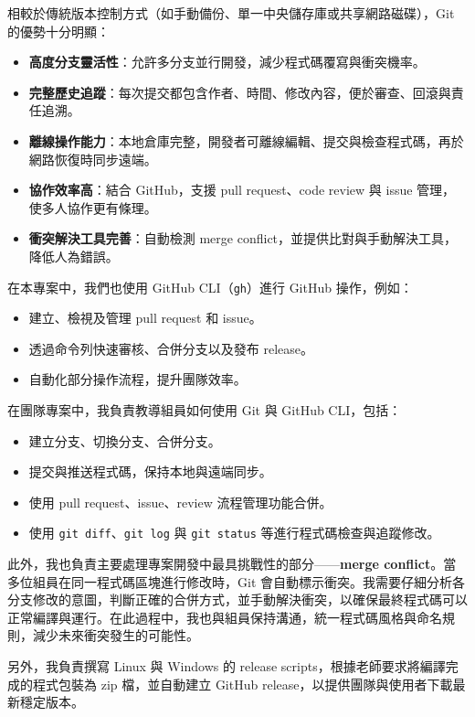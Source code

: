 \documentclass[a4paper,12pt]{article}
\begin{document}
相較於傳統版本控制方式（如手動備份、單一中央儲存庫或共享網路磁碟），Git 的優勢十分明顯：
\begin{itemize}
  \item \textbf{高度分支靈活性}：允許多分支並行開發，減少程式碼覆寫與衝突機率。
  \item \textbf{完整歷史追蹤}：每次提交都包含作者、時間、修改內容，便於審查、回滾與責任追溯。
  \item \textbf{離線操作能力}：本地倉庫完整，開發者可離線編輯、提交與檢查程式碼，再於網路恢復時同步遠端。
  \item \textbf{協作效率高}：結合 GitHub，支援 pull request、code review 與 issue 管理，使多人協作更有條理。
  \item \textbf{衝突解決工具完善}：自動檢測 merge conflict，並提供比對與手動解決工具，降低人為錯誤。
\end{itemize}

在本專案中，我們也使用 GitHub CLI（\verb|gh|）進行 GitHub 操作，例如：
\begin{itemize}
  \item 建立、檢視及管理 pull request 和 issue。
  \item 透過命令列快速審核、合併分支以及發布 release。
  \item 自動化部分操作流程，提升團隊效率。
\end{itemize}

在團隊專案中，我負責教導組員如何使用 Git 與 GitHub CLI，包括：
\begin{itemize}
  \item 建立分支、切換分支、合併分支。
  \item 提交與推送程式碼，保持本地與遠端同步。
  \item 使用 pull request、issue、review 流程管理功能合併。
  \item 使用 \verb|git diff|、\verb|git log| 與 \verb|git status| 等進行程式碼檢查與追蹤修改。
\end{itemize}

此外，我也負責主要處理專案開發中最具挑戰性的部分——\textbf{merge conflict}。當多位組員在同一程式碼區塊進行修改時，Git 會自動標示衝突。我需要仔細分析各分支修改的意圖，判斷正確的合併方式，並手動解決衝突，以確保最終程式碼可以正常編譯與運行。在此過程中，我也與組員保持溝通，統一程式碼風格與命名規則，減少未來衝突發生的可能性。

另外，我負責撰寫 Linux 與 Windows 的 release scripts，根據老師要求將編譯完成的程式包裝為 zip 檔，並自動建立 GitHub release，以提供團隊與使用者下載最新穩定版本。
\end{document}

